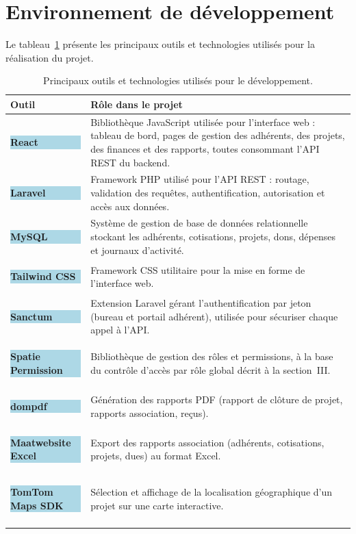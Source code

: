 \section{Environnement de développement}

Le tableau~\ref{tab:outils} présente les principaux outils et technologies
utilisés pour la réalisation du projet.

\begin{center}
\begin{longtable}{@{}p{2.6cm}p{11.5cm}@{}}
\toprule
\textbf{Outil} & \textbf{Rôle dans le projet} \\
\midrule
\endhead
\colorbox{lightblue}{\parbox[c][0.9cm][c]{2.3cm}{\centering\bfseries React}} &
  Bibliothèque JavaScript utilisée pour l'interface web : tableau de bord,
  pages de gestion des adhérents, des projets, des finances et des rapports,
  toutes consommant l'API REST du backend. \\[0.4cm]
\colorbox{lightblue}{\parbox[c][0.9cm][c]{2.3cm}{\centering\bfseries Laravel}} &
  Framework PHP utilisé pour l'API REST : routage, validation des requêtes,
  authentification, autorisation et accès aux données. \\[0.4cm]
\colorbox{lightblue}{\parbox[c][0.9cm][c]{2.3cm}{\centering\bfseries MySQL}} &
  Système de gestion de base de données relationnelle stockant les
  adhérents, cotisations, projets, dons, dépenses et journaux d'activité. \\[0.4cm]
\colorbox{lightblue}{\parbox[c][0.9cm][c]{2.3cm}{\centering\bfseries Tailwind CSS}} &
  Framework CSS utilitaire pour la mise en forme de l'interface web. \\[0.4cm]
\colorbox{lightblue}{\parbox[c][0.9cm][c]{2.3cm}{\centering\bfseries Sanctum}} &
  Extension Laravel gérant l'authentification par jeton (bureau et portail
  adhérent), utilisée pour sécuriser chaque appel à l'API. \\[0.4cm]
\colorbox{lightblue}{\parbox[c][0.9cm][c]{2.3cm}{\centering\bfseries Spatie Permission}} &
  Bibliothèque de gestion des rôles et permissions, à la base du contrôle
  d'accès par rôle global décrit à la section~III. \\[0.4cm]
\colorbox{lightblue}{\parbox[c][0.9cm][c]{2.3cm}{\centering\bfseries dompdf}} &
  Génération des rapports PDF (rapport de clôture de projet, rapports
  association, reçus). \\[0.4cm]
\colorbox{lightblue}{\parbox[c][0.9cm][c]{2.3cm}{\centering\bfseries Maatwebsite Excel}} &
  Export des rapports association (adhérents, cotisations, projets, dues)
  au format Excel. \\[0.4cm]
\colorbox{lightblue}{\parbox[c][0.9cm][c]{2.3cm}{\centering\bfseries TomTom Maps SDK}} &
  Sélection et affichage de la localisation géographique d'un projet sur une
  carte interactive. \\
\bottomrule
\caption{Principaux outils et technologies utilisés pour le développement.}
\label{tab:outils}
\end{longtable}
\end{center}

